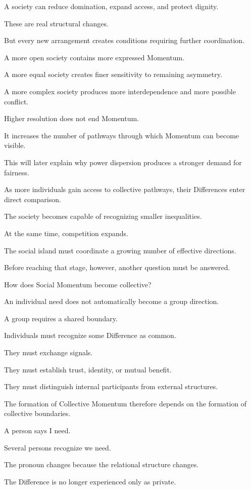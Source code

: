 A society can reduce domination, expand access, and protect dignity.

These are real structural changes.

But every new arrangement creates conditions requiring further coordination.

A more open society contains more expressed Momentum.

A more equal society creates finer sensitivity to remaining asymmetry.

A more complex society produces more interdependence and more possible conflict.

Higher resolution does not end Momentum.

It increases the number of pathways through which Momentum can become visible.

This will later explain why power dispersion produces a stronger demand for fairness.

As more individuals gain access to collective pathways, their Differences enter direct comparison.

The society becomes capable of recognizing smaller inequalities.

At the same time, competition expands.

The social island must coordinate a growing number of effective directions.

Before reaching that stage, however, another question must be answered.

How does Social Momentum become collective?

An individual need does not automatically become a group direction.

A group requires a shared boundary.

Individuals must recognize some Difference as common.

They must exchange signals.

They must establish trust, identity, or mutual benefit.

They must distinguish internal participants from external structures.

The formation of Collective Momentum therefore depends on the formation of collective boundaries.

A person says I need.

Several persons recognize we need.

The pronoun changes because the relational structure changes.

The Difference is no longer experienced only as private.

